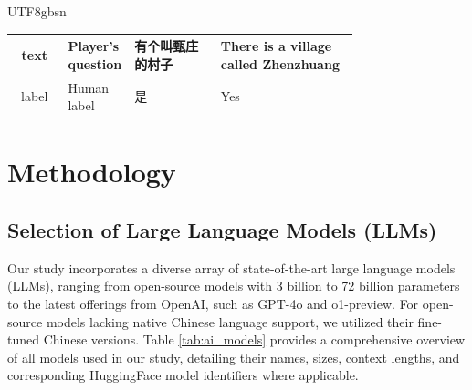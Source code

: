 \documentclass[conference]{IEEEtran}
\begin{document}
\begin{table}[h!]
\begin{CJK*}{UTF8}{gbsn}
{\begin{tabular}{|c|>{\centering\arraybackslash}p{0.1\linewidth}|>{\centering\arraybackslash}p{0.25\linewidth}|>{\centering\arraybackslash}p{0.4\linewidth}|}
    text & Player's question & 有个叫甄庄的村子 & There is a village called Zhenzhuang \\ \hline 
    label & Human label & 是 & Yes \\ \hline 
    \end{tabular}
    }
    \end{CJK*}
\end{table}
\section{Methodology}

\subsection{Selection of Large Language Models (LLMs)}

Our study incorporates a diverse array of state-of-the-art large language models (LLMs), ranging from open-source models with 3 billion to 72 billion parameters to the latest offerings from OpenAI, such as GPT-4o and o1-preview. For open-source models lacking native Chinese language support, we utilized their fine-tuned Chinese versions. Table \ref{tab:ai_models} provides a comprehensive overview of all models used in our study, detailing their names, sizes, context lengths, and corresponding HuggingFace model identifiers where applicable.
\end{document}
